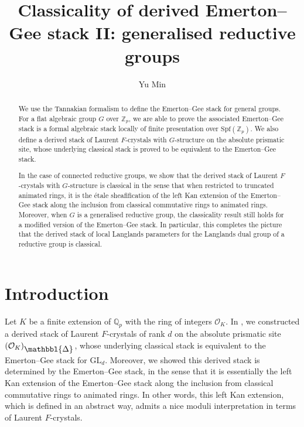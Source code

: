 \documentclass[10pt]{article}
\numberwithin{equation}{section}
\newcommand{\bQ}{{\mathbb Q}}
\newcommand{\bZ}{{\mathbb Z}}
\newcommand{\calO}{{\mathcal O}}
\newcommand{\Spf}{{\mathrm{Spf}}}           %
\newcommand{\GL}{{\mathrm{GL}}}             %
\newcommand{\Prism}{{\mathlarger{\mathbbl{\Delta}}}} %
\begin{document}
\title{Classicality of derived Emerton–Gee stack II: generalised reductive groups}
\author{Yu Min}
\date{}
\maketitle

\begin{abstract}
We use the Tannakian formalism to define the Emerton--Gee stack for general groups. For a flat algebraic group $G$ over $\bZ_p$, we are able to prove the associated Emerton--Gee stack is a formal algebraic stack locally of finite presentation over $\Spf(\bZ_p)$. We also define a derived stack of Laurent $F$-crystals with $G$-structure on the absolute prismatic site, whose underlying classical stack is proved to be equivalent to the Emerton--Gee stack.

In the case of connected reductive groups, we show that the derived stack of Laurent $F$-crystals with $G$-structure is classical in the sense that
when restricted to truncated animated rings, it is the \'etale sheafification of the left Kan extension of the Emerton--Gee stack along the inclusion from classical commutative rings to animated rings. Moreover, when $G$ is a generalised reductive group, the classicality result still holds for a modified version of the Emerton--Gee stack. In particular, this completes the picture that the derived stack of local Langlands parameters for the Langlands dual group of a reductive group is classical.
\end{abstract}




\tableofcontents

\section{Introduction}
Let $K$ be a finite extension of $\bQ_p$ with the ring of integers $\calO_K$. In \cite{Min23}, we constructed a derived stack of Laurent $F$-crystals of rank $d$ on the absolute prismatic site $(\calO_K)_{\Prism}$, whose underlying classical stack is equivalent to the Emerton--Gee stack for $\GL_d$. Moreover, we showed this derived stack is determined by the Emerton--Gee stack, in the sense that it is essentially the left Kan extension of the Emerton--Gee stack along the inclusion from classical commutative rings to animated rings. In other words, this left Kan extension, which is defined in an abstract way, admits a nice moduli interpretation in terms of Laurent $F$-crystals.
\end{document}

